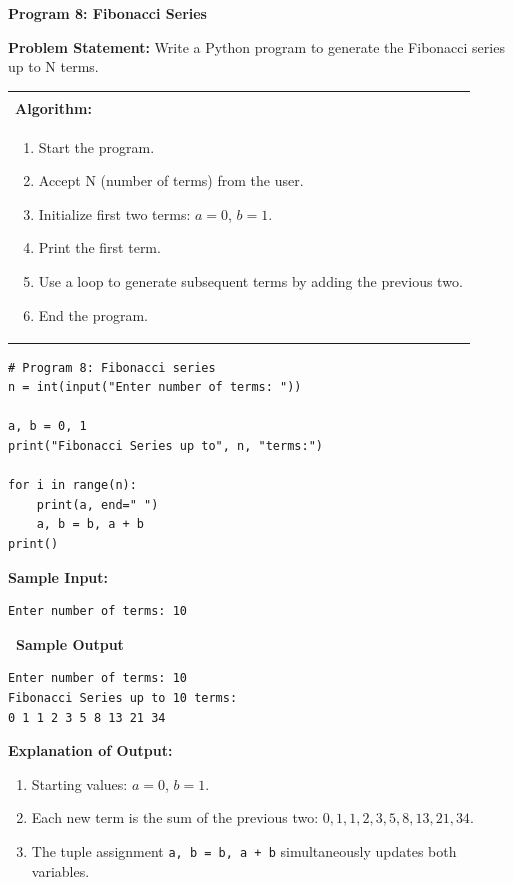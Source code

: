 \documentclass[12pt,a4paper]{article}
\makeatletter
\newcommand{\outhead}{\noindent\colorbox{cmrgreen!25}%
  {\textbf{\small\color{cmrdark}~Sample Output~}}\par\vspace{-1pt}}
\newenvironment{algobox}{%
  \par\vspace{4pt}%
  \noindent\begin{tabular}{@{}p{\linewidth}@{}}%
  \hline\\[-8pt]%
  \textbf{\color{blue!60!black}\small Algorithm:}\\[2pt]%
}{%
  \\[-4pt]\hline%
  \end{tabular}\par\vspace{4pt}%
}
\makeatother
\begin{document}
\vspace{0.5cm}

\textbf{Program 8: Fibonacci Series}

\textbf{Problem Statement:}
Write a Python program to generate the Fibonacci series up to N terms.

\begin{algobox}
\begin{enumerate}[label=Step \arabic*:]
  \item Start the program.
  \item Accept N (number of terms) from the user.
  \item Initialize first two terms: $a = 0$, $b = 1$.
  \item Print the first term.
  \item Use a loop to generate subsequent terms by adding the previous two.
  \item End the program.
\end{enumerate}
\end{algobox}

\begin{lstlisting}
# Program 8: Fibonacci series
n = int(input("Enter number of terms: "))

a, b = 0, 1
print("Fibonacci Series up to", n, "terms:")

for i in range(n):
    print(a, end=" ")
    a, b = b, a + b
print()
\end{lstlisting}

\textbf{Sample Input:}
\begin{verbatim}
Enter number of terms: 10
\end{verbatim}

\outhead
\begin{lstlisting}[style=outputstyle]
Enter number of terms: 10
Fibonacci Series up to 10 terms:
0 1 1 2 3 5 8 13 21 34
\end{lstlisting}

\textbf{Explanation of Output:}
\begin{enumerate}
  \item Starting values: $a = 0$, $b = 1$.
  \item Each new term is the sum of the previous two: $0, 1, 1, 2, 3, 5, 8, 13, 21, 34$.
  \item The tuple assignment \texttt{a, b = b, a + b} simultaneously updates both variables.
\end{enumerate}

\vspace{0.5cm}
\end{document}
